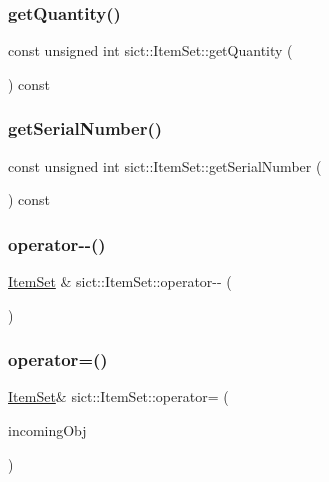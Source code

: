 \subsubsection{\texorpdfstring{getQuantity()}{getQuantity()}}
{\footnotesize\ttfamily const unsigned int sict\+::\+Item\+Set\+::get\+Quantity (\begin{DoxyParamCaption}{ }\end{DoxyParamCaption}) const}

\mbox{\label{classsict_1_1ItemSet_ab67dbc2189195da464da446dad1238a9}} 
\subsubsection{\texorpdfstring{getSerialNumber()}{getSerialNumber()}}
{\footnotesize\ttfamily const unsigned int sict\+::\+Item\+Set\+::get\+Serial\+Number (\begin{DoxyParamCaption}{ }\end{DoxyParamCaption}) const}

\mbox{\label{classsict_1_1ItemSet_a539f3dee79de277f30f6ebcf8453b25f}} 
\subsubsection{\texorpdfstring{operator-\/-\/()}{operator--()}}
{\footnotesize\ttfamily \mbox{\hyperlink{classsict_1_1ItemSet}{Item\+Set}} \& sict\+::\+Item\+Set\+::operator-\/-\/ (\begin{DoxyParamCaption}{ }\end{DoxyParamCaption})}

\mbox{\label{classsict_1_1ItemSet_a76155437cf9aef0adf0b26ed44383b85}} 
\subsubsection{\texorpdfstring{operator=()}{operator=()}\hspace{0.1cm}{\footnotesize\ttfamily [1/2]}}
{\footnotesize\ttfamily \mbox{\hyperlink{classsict_1_1ItemSet}{Item\+Set}}\& sict\+::\+Item\+Set\+::operator= (\begin{DoxyParamCaption}\item[{const \mbox{\hyperlink{classsict_1_1ItemSet}{Item\+Set}} \&}]{incoming\+Obj }\end{DoxyParamCaption})\hspace{0.3cm}{\ttfamily [delete]}}

